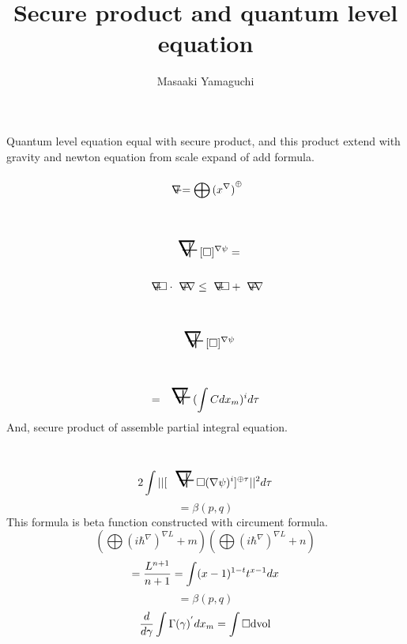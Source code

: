 \documentclass{jsarticle}
\begin{document}
\title{Secure product and quantum level equation}
\author{Masaaki Yamaguchi}
\date{}
\maketitle
   \newcommand{\variint}{%
	\begin{picture}(15,30)
		\put(0,0){
			$ \iint $}
		\put(0,5){\line(15,0){15}}
	\end{picture} %
}

\newcommand{\variiint}{%
	\begin{picture}(15,15)
		\put(0,0){
			$ \iiint $}
		\put(0,5){\line(15,0){20}}
	\end{picture} %
}



 \newcommand{\alearletter}{%
	 \begin{picture}(10,20)
		 \put(0,0){
			 $ \square $}
		 \put(0,0){\line(1,1){10}}
	 \end{picture} %
	 }

 \newcommand{\secproduct}{%
	 \begin{picture}(10,20)
		 \put(0,0){
			 $ \nabla $}
		 \put(5,0){+}
	 \end{picture} %
	 }

Quantum level equation equal with secure product,
and this product extend with gravity and newton equation
from scale expand of add formula.
	 $$ \secproduct = \bigoplus{(x^{\nabla})}^{\oplus}$$
      

$$  \scalebox{2}[2]{\secproduct}[\square]^{\nabla \psi} = $$
$$   \secproduct \square \cdot  \secproduct \nabla \le 
   \secproduct \square + \secproduct \nabla $$
$$ \scalebox{2}[2]{\secproduct}[\square]^{\nabla \psi}  $$
$$ = \scalebox{2}[2]{\secproduct}(\int C dx_m)^{i}d \tau $$
And, secure product of assemble partial integral equation.
$$ 2\int ||[\scalebox{2}[2]{\secproduct} \square(\nabla \psi)^{i}]^{
	\oplus \tau}||^{2}d \tau $$
$$ = \beta(p,q) $$
This formula is beta function constructed with circument formula.
$$ (\bigoplus {(i \hbar^{\nabla})}^{\nabla L} + m)
(\bigoplus {(i \hbar^{\nabla})}^{\nabla L} + n) $$
$$ = {L^{n+1} \over {n+1}} = \int (x - 1)^{1 - t}t^{x - 1}dx $$
$$ = \beta(p,q) $$
$$ {d \over d\gamma}\int \Gamma(\gamma)^{'}dx_m = \int \square \mathrm{dvol} $$
\end{document}
